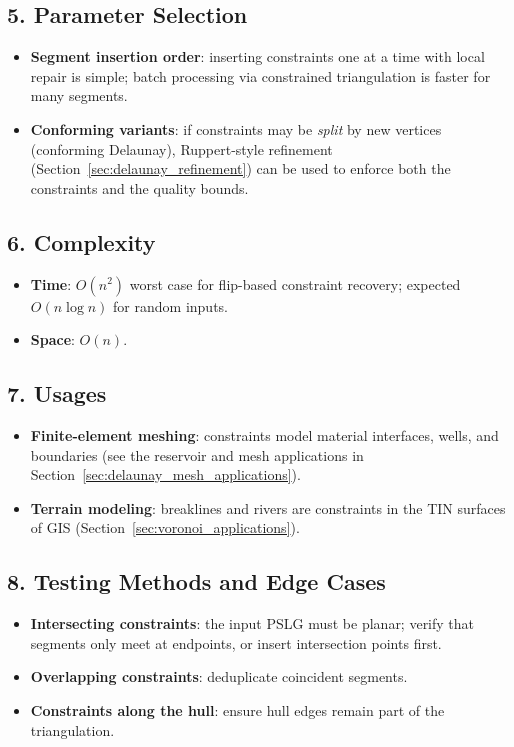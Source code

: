 \subsection{5. Parameter Selection}

\begin{itemize}
\item \textbf{Segment insertion order}: inserting constraints one at a time with
  local repair is simple; batch processing via constrained triangulation is
  faster for many segments.
\item \textbf{Conforming variants}: if constraints may be \emph{split} by new
  vertices (conforming Delaunay), Ruppert-style refinement
  (Section~\ref{sec:delaunay_refinement}) can be used to enforce both the
  constraints and the quality bounds.
\end{itemize}

\subsection{6. Complexity}

\begin{itemize}
\item \textbf{Time}: $O(n^2)$ worst case for flip-based constraint recovery;
  expected $O(n \log n)$ for random inputs.
\item \textbf{Space}: $O(n)$.
\end{itemize}

\subsection{7. Usages}

\begin{itemize}
\item \textbf{Finite-element meshing}: constraints model material interfaces,
  wells, and boundaries (see the reservoir and mesh applications in
  Section~\ref{sec:delaunay_mesh_applications}).
\item \textbf{Terrain modeling}: breaklines and rivers are constraints in the
  TIN surfaces of GIS (Section~\ref{sec:voronoi_applications}).
\end{itemize}

\subsection{8. Testing Methods and Edge Cases}

\begin{itemize}
\item \textbf{Intersecting constraints}: the input PSLG must be planar; verify
  that segments only meet at endpoints, or insert intersection points first.
\item \textbf{Overlapping constraints}: deduplicate coincident segments.
\item \textbf{Constraints along the hull}: ensure hull edges remain part of the
  triangulation.
\end{itemize}

